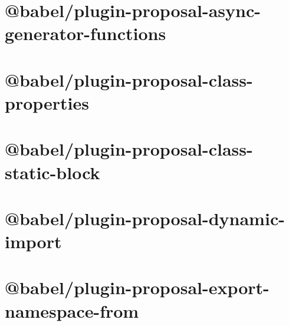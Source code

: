\documentclass[twoside]{book}
\newcommand{\+}{\discretionary{\mbox{\scriptsize$\hookleftarrow$}}{}{}}
\begin{document}
\chapter{@babel/plugin-\/proposal-\/async-\/generator-\/functions}
\label{md__c___users_vaishnavi_jadhav__desktop__developer_code_mean_stack_example_client_node_modules__10a5460ed542bdfc811c8f648d7e142b}

\chapter{@babel/plugin-\/proposal-\/class-\/properties}
\label{md__c___users_vaishnavi_jadhav__desktop__developer_code_mean_stack_example_client_node_modules__a53405d21a4c1473843a8cd24ec24349}

\chapter{@babel/plugin-\/proposal-\/class-\/static-\/block}
\label{md__c___users_vaishnavi_jadhav__desktop__developer_code_mean_stack_example_client_node_modules__9d04cdbc8907ad24528eaecf04281f28}

\chapter{@babel/plugin-\/proposal-\/dynamic-\/import}
\label{md__c___users_vaishnavi_jadhav__desktop__developer_code_mean_stack_example_client_node_modules__02a7d53632321433e7172d308bef2af3}

\chapter{@babel/plugin-\/proposal-\/export-\/namespace-\/from}
\label{md__c___users_vaishnavi_jadhav__desktop__developer_code_mean_stack_example_client_node_modules__680a5c6464515bd9253ebda7a7f890f2}

\end{document}
